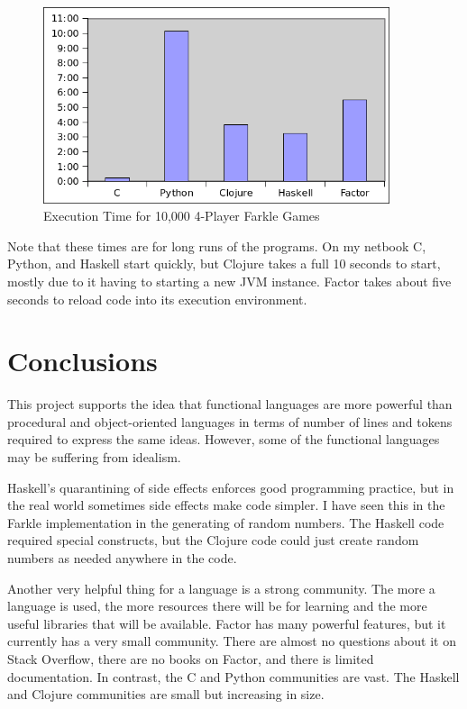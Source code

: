 \documentclass{article}
\begin{document}
\begin{figure}[h]
    \centering
    \includegraphics[width=4in]{graphs/performance-comparison.png}
    \caption{Execution Time for 10,000 4-Player Farkle Games \label{fig:performance}}
\end{figure}

Note that these times are for long runs of the programs.  On my netbook C,
Python, and Haskell start quickly, but Clojure takes a full 10
seconds to start, mostly due to it having to starting a new JVM instance.  Factor
takes about five seconds to reload code into its execution environment.

\section{Conclusions}
This project supports the idea that functional languages are more powerful than
procedural and object-oriented languages in terms of number of lines and tokens
required to express the same ideas.  However, some of the functional languages
may be suffering from idealism.

Haskell's quarantining of side effects enforces good programming practice, but
in the real world sometimes side effects make code simpler.  I have seen this
in the Farkle implementation in the generating of random numbers.  The Haskell
code required special constructs, but the Clojure code could just create random
numbers as needed anywhere in the code.

Another very helpful thing for a language is a strong community.  The more a
language is used, the more resources there will be for learning and the more
useful libraries that will be available.  Factor has many powerful features, but
it currently has a very small community.  There are almost no questions about it on
Stack Overflow, there are no books on Factor, and there is limited
documentation.  In contrast, the C and Python communities are vast.  The Haskell
and Clojure communities are small but increasing in size.
\end{document}
